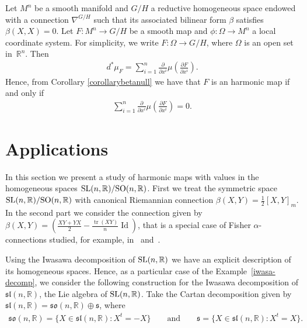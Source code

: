 \documentclass[pdftex]{sigma}
\numberwithin{equation}{section}
\begin{document}
\begin{Example}\label{superficieharmonic}
  Let $M^n$ be a smooth manifold  and $G/H$ a reductive homogeneous space endowed with a connection $\nabla^{G/H}$ such that its associated  bilinear form $\beta$ satisf\/ies $\beta(X,X) = 0$. Let $F\colon  M^n \rightarrow G/H$ be a smooth map and $\phi\colon \Omega \rightarrow M^n$ a local coordinate system.
   For simplicity, we write $F\colon\Omega \rightarrow G/H$, where $\Omega$ is an open set in~${\mathbb R}^n$. Then
  \begin{gather*}
    d^*\mu_{F} = \sum_{i=1}^n \frac{\partial}{\partial x^i}\mu\left(\frac{\partial F}{\partial x^i} \right).
  \end{gather*}
  Hence, from Corollary \ref{corollarybetanull} we have that   $F$ is an harmonic map if and only if
  \begin{gather*}
    \sum_{i=1}^n \frac{\partial}{\partial x^i}\mu\left(\frac{\partial F}{\partial x^i} \right) = 0.
  \end{gather*}
\end{Example}



\section{Applications}\label{section4}

In this section we present a study of harmonic maps with values in
the homogeneous spaces  ${\rm SL}(n,\mathbb{R})/{\rm
SO}(n,\mathbb{R})$. First we treat the symmetric space  ${\rm
SL}(n,\mathbb{R})/{\rm SO}(n,\mathbb{R})$ with canonical Riemannian
connection $\beta(X,Y) = \frac{1}{2}[X,Y]_m$. In the second part we
consider the  connection given by $\beta(X,Y) =
\left(\frac{XY+YX}{2} - \frac{\operatorname{tr}(XY)}{n}\operatorname{Id}\right)$, that is a
special case of Fisher $\alpha$-connections studied, for example, in~\cite{FernandesM/San-MartinL} and~\cite{FernandesM/San-MartinL2}.

Using the Iwasawa decomposition of ${\rm SL}(n,\mathbb{R})$ we have an explicit description of its homogeneous spaces. Hence, as a particular case of the Example~\ref{iwasa-decomp}, we consider the following construction for the Iwasawa decomposition of ${\mathfrak{sl}}(n, {\mathbb R})$, the Lie algebra of ${\rm SL}(n,\mathbb{R})$. Take the Cartan decomposition given by ${\mathfrak{sl}}(n, {\mathbb R})={\mathfrak{so}}(n,{\mathbb R}) \oplus {\mathfrak s}$, where
\begin{gather*}
  {\mathfrak{so}}(n,{\mathbb R})= \big\{ X \in {\mathfrak{sl}}(n, {\mathbb R})\colon  X^{t}=-X \big\} \qquad
  \mbox{and} \qquad {\mathfrak s}=\big\{X \in {\mathfrak{sl}}(n, {\mathbb R})\colon X^{t}=X \big\}.
\end{gather*}
\end{document}
